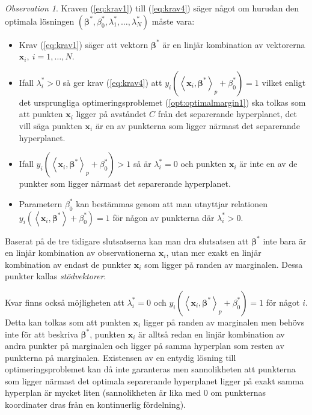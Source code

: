 \documentclass[a4paper, 12pt]{report}
\theoremstyle{definition}
\theoremstyle{remark}
\newtheorem*{rem}{Observation}
\newcommand{\bfbeta}{{\boldsymbol{\beta}}}
\newcommand{\bfx}{\mathbf{x}}
\newcommand{\llangle}{\left\langle}
\newcommand{\rrangle}{\right\rangle}
\newcommand{\inner}[2]{\llangle #1, #2 \rrangle}
\begin{document}
\begin{rem}
	Kraven (\ref{eq:krav1}) till (\ref{eq:krav4}) säger något om hurudan den optimala lösningen $\left(\bfbeta^*,\beta^*_0, \lambda_1^*,\dots,\lambda_N^*\right)$ måste vara:
	\begin{itemize}
		\item Krav (\ref{eq:krav1}) säger att vektorn $\bfbeta^*$ är en linjär kombination av vektorerna $\mathbf{x}_i,~i=1,\dots,N$.
		\item Ifall $\lambda^*_i > 0$ så ger krav (\ref{eq:krav4}) att $y_i\left(\inner{\bfx_i}{\bfbeta^*}_p+\beta^*_0\right) = 1$ vilket enligt det ursprungliga optimeringsproblemet (\ref{opt:optimalmargin1}) ska tolkas som att punkten $\mathbf{x}_i$ ligger på avståndet $C$ från det separerande hyperplanet, det vill säga punkten $\mathbf{x}_i$ är en av punkterna som ligger närmast det separerande hyperplanet.
		\item Ifall $y_i\left(\inner{\bfx_i}{\bfbeta^*}_p + \beta^*_0\right) > 1$ så är $\lambda^*_i = 0$ och punkten $\mathbf{x}_i$ är inte en av de punkter som ligger närmast det separerande hyperplanet.
		\item Parametern $\beta^*_0$ kan bestämmas genom att man utnyttjar relationen $y_i\left( \inner{\bfx_i}{\bfbeta^*} + \beta^*_0\right) = 1$ för någon av punkterna där $\lambda^*_i > 0$.
	\end{itemize}
	Baserat på de tre tidigare slutsatserna kan man dra slutsatsen att $\bfbeta^*$ inte bara är en linjär kombination av observationerna $\mathbf{x}_i$, utan mer exakt en linjär kombination av endast de punkter $\mathbf{x}_{i}$ som ligger på randen av marginalen. Dessa punkter kallas \emph{stödvektorer}.
\end{rem}

Kvar finns också möjligheten att $\lambda^*_i = 0$ och $y_i\left( \inner{\bfx_i}{\bfbeta^*}_p + \beta^*_0\right) = 1$ för något $i$.
Detta kan tolkas som att punkten $\bfx_i$ ligger på randen av marginalen men behövs inte för att beskriva $\bfbeta^*$, punkten $\bfx_i$ är alltså redan en linjär kombination av andra punkter på marginalen och ligger på samma hyperplan som resten av punkterna på marginalen.
Existensen av en entydig lösning till optimeringsproblemet kan då inte garanteras men sannolikheten att punkterna som ligger närmast det optimala separerande hyperplanet ligger på exakt samma hyperplan är mycket liten (sannolikheten är lika med 0 om punkternas koordinater dras från en kontinuerlig fördelning).
\newpage
\end{document}
